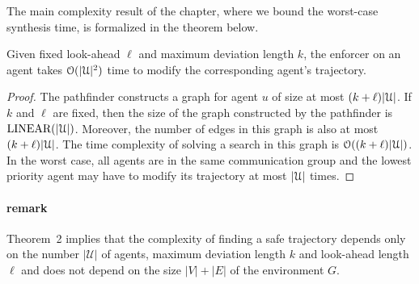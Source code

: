 \noindent The main complexity result of the chapter, where we bound the worst-case synthesis time, is formalized in the theorem below.
\begin{thm}
Given fixed look-ahead $\ell$ and maximum deviation length $k$, the enforcer on an agent takes $\mathcal{O}(|\mathcal{U}|^2)$ time to modify the corresponding agent's trajectory. 
\end{thm}
\begin{proof}
The pathfinder constructs a graph for agent $u$ of size at most $(k+\ell) |\mathcal{U}|$. If $k$ and $\ell$ are fixed, then the size of the graph constructed by the pathfinder is $\text{LINEAR}(|\mathcal{U}|)$. Moreover, the number of edges in this graph is also at most $(k+\ell)|\mathcal{U}|$. The time complexity of solving a search in this graph is $\mathcal{O}((k+\ell)|\mathcal{U}|)$. In the worst case, all agents are in the same communication group and the lowest priority agent may have to modify its trajectory at most $|\mathcal{U}|$ times. %
\end{proof}
\paragraph{remark} Theorem~2 implies that the complexity of finding a safe trajectory depends only on the number $|\mathcal{U}|$ of agents, maximum deviation length $k$ and look-ahead length $\ell$ and does not depend on the size $|V|+|E|$ of the environment $G$. 
